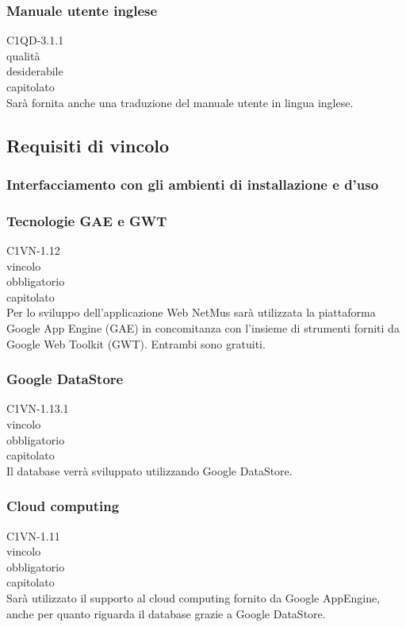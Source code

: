 \subsubsection*{Manuale utente inglese}
 C1QD-3.1.1 \\
 qualit\`a \\
 desiderabile \\
 capitolato \\
Sar\`a fornita anche una traduzione del manuale utente in lingua inglese.


\subsection{Requisiti di vincolo}

\subsubsection{Interfacciamento con gli ambienti di installazione e d'uso }

\subsubsection*{Tecnologie GAE e GWT}
 C1VN-1.12 \\
 vincolo \\
 obbligatorio \\
 capitolato \\
Per lo sviluppo dell'applicazione Web NetMus sar\`a utilizzata la piattaforma
Google App Engine (GAE) in concomitanza con l'insieme di strumenti forniti da Google Web Toolkit (GWT). Entrambi sono gratuiti.

\subsubsection*{Google DataStore}
 C1VN-1.13.1 \\
 vincolo \\
 obbligatorio \\
 capitolato \\
Il database verr\`a sviluppato utilizzando Google DataStore.

\subsubsection*{Cloud computing}
 C1VN-1.11 \\
 vincolo \\
 obbligatorio \\
 capitolato \\
Sar\`a utilizzato il supporto al cloud computing fornito da Google AppEngine,
anche per quanto riguarda il database grazie a Google DataStore.

